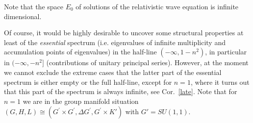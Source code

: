 \documentclass[10]{amsart}
\theoremstyle{remark}
\theoremstyle{definition}
\numberwithin{equation}{section}
\begin{document}
{%
\noindent
Note that the space $E_0$ of solutions of the relativistic wave equation is infinite dimensional.

Of course, it would be highly desirable to uncover some structural properties at least of the {\it essential} spectrum (i.e. eigenvalues of infinite multiplicity and 
accumulation points of eigenvalues) in the half-line $(-\infty,1-n^2)$, in particular in $(-\infty,-n^2]$ (contributions of unitary principal series). However, at the moment we cannot exclude the extreme cases that the latter part of the essential spectrum 
is either empty or the full half-line, except for $n=1$, where it turns out that this part of the spectrum is always infinite, see Cor.~\ref{late}. 
Note that for $n=1$ we are in the group manifold situation $(G,H,L)\cong (G^{\prime}\times G^{\prime},\Delta G^{\prime},G^{\prime}\times K')$ with $G'=SU(1,1)$.

}
\end{document}
